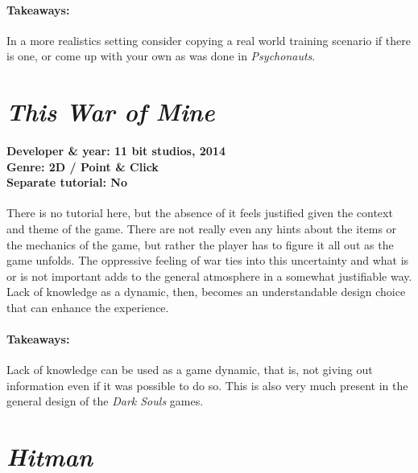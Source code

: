 \paragraph{Takeaways:}
In a more realistics setting consider copying a real world training scenario if there is one, or come up with your own as was done in \textit{Psychonauts}.

\section{\textit{This War of Mine}}
\paragraph{Developer \& year: 11 bit studios, 2014 \\ Genre: 2D / Point \& Click \\ Separate tutorial: No \\}
There is no tutorial here, but the absence of it feels justified given the context and theme of the game. There are not really even any hints about the items or the mechanics of the game, but rather the player has to figure it all out as the game unfolds. The oppressive feeling of war ties into this uncertainty and what is or is not important adds to the general atmosphere in a somewhat justifiable way. Lack of knowledge as a dynamic, then, becomes an understandable design choice that can enhance the experience.
\paragraph{Takeaways:}
Lack of knowledge can be used as a game dynamic, that is, not giving out information even if it was possible to do so. This is also very much present in the general design of the \textit{Dark Souls} games.

\section{\textit{Hitman}}
